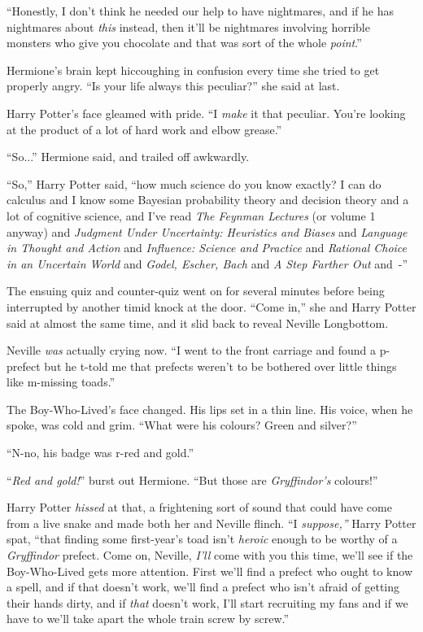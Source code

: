 ``Honestly, I don't think he needed our help to have nightmares, and if he has nightmares about \emph{this} instead, then it'll be nightmares involving horrible monsters who give you chocolate and that was sort of the whole \emph{point}.''

Hermione's brain kept hiccoughing in confusion every time she tried to get properly angry. ``Is your life always this peculiar?'' she said at last.

Harry Potter's face gleamed with pride. ``I \emph{make} it that peculiar. You're looking at the product of a lot of hard work and elbow grease.''

``So...'' Hermione said, and trailed off awkwardly.

``So,'' Harry Potter said, ``how much science do you know exactly? I can do calculus and I know some Bayesian probability theory and decision theory and a lot of cognitive science, and I've read \emph{The Feynman Lectures} (or volume 1 anyway) and \emph{Judgment Under Uncertainty: Heuristics and Biases} and \emph{Language in Thought and Action} and \emph{Influence: Science and Practice} and \emph{Rational Choice in an Uncertain World} and \emph{Godel, Escher, Bach} and \emph{A Step Farther Out} and~-''

The ensuing quiz and counter-quiz went on for several minutes before being interrupted by another timid knock at the door. ``Come in,'' she and Harry Potter said at almost the same time, and it slid back to reveal Neville Longbottom.

Neville \emph{was} actually crying now. ``I went to the front carriage and found a p-prefect but he t-told me that prefects weren't to be bothered over little things like m-missing toads.''

The Boy-Who-Lived's face changed. His lips set in a thin line. His voice, when he spoke, was cold and grim. ``What were his colours? Green and silver?''

``N-no, his badge was r-red and gold.''

``\emph{Red and gold!}'' burst out Hermione. ``But those are \emph{Gryffindor's} colours!''

Harry Potter \emph{hissed} at that, a frightening sort of sound that could have come from a live snake and made both her and Neville flinch. ``I \emph{suppose,''} Harry Potter spat, ``that finding some first-year's toad isn't \emph{heroic} enough to be worthy of a \emph{Gryffindor} prefect. Come on, Neville, \emph{I'll} come with you this time, we'll see if the Boy-Who-Lived gets more attention. First we'll find a prefect who ought to know a spell, and if that doesn't work, we'll find a prefect who isn't afraid of getting their hands dirty, and if \emph{that} doesn't work, I'll start recruiting my fans and if we have to we'll take apart the whole train screw by screw.''

